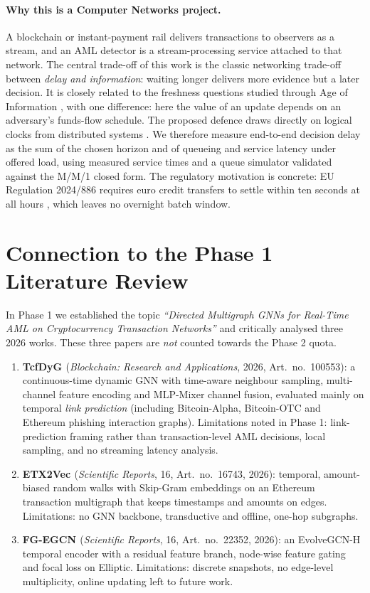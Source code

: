 \documentclass[11pt,a4paper]{article}
\begin{document}
\paragraph{Why this is a Computer Networks project.} A blockchain or instant-payment rail delivers transactions to observers as a stream, and an AML detector is a stream-processing service attached to that network. The central trade-off of this work is the classic networking trade-off between \emph{delay and information}: waiting longer delivers more evidence but a later decision. It is closely related to the freshness questions studied through Age of Information \cite{kaul2012aoi}, with one difference: here the value of an update depends on an adversary's funds-flow schedule. The proposed defence draws directly on logical clocks from distributed systems \cite{lamport1978clocks}. We therefore measure end-to-end decision delay as the sum of the chosen horizon and of queueing and service latency under offered load, using measured service times and a queue simulator validated against the M/M/1 closed form. The regulatory motivation is concrete: EU Regulation 2024/886 requires euro credit transfers to settle within ten seconds at all hours \cite{eu2024instant,abolfadl2026kontograph}, which leaves no overnight batch window.

\section{Connection to the Phase 1 Literature Review}
\label{sec:phase1_connection}

In Phase 1 we established the topic \textit{``Directed Multigraph GNNs for Real-Time AML on Cryptocurrency Transaction Networks''} and critically analysed three 2026 works. These three papers are \emph{not} counted towards the Phase 2 quota.
\begin{enumerate}[leftmargin=*]
    \item \textbf{TcfDyG \cite{li2026tcfdyg}} (\textit{Blockchain: Research and Applications}, 2026, Art.\ no.\ 100553): a continuous-time dynamic GNN with time-aware neighbour sampling, multi-channel feature encoding and MLP-Mixer channel fusion, evaluated mainly on temporal \emph{link prediction} (including Bitcoin-Alpha, Bitcoin-OTC and Ethereum phishing interaction graphs). Limitations noted in Phase 1: link-prediction framing rather than transaction-level AML decisions, local sampling, and no streaming latency analysis.
    \item \textbf{ETX2Vec \cite{lu2026etx2vec}} (\textit{Scientific Reports}, 16, Art.\ no.\ 16743, 2026): temporal, amount-biased random walks with Skip-Gram embeddings on an Ethereum transaction multigraph that keeps timestamps and amounts on edges. Limitations: no GNN backbone, transductive and offline, one-hop subgraphs.
    \item \textbf{FG-EGCN \cite{han2026fgegcn}} (\textit{Scientific Reports}, 16, Art.\ no.\ 22352, 2026): an EvolveGCN-H temporal encoder with a residual feature branch, node-wise feature gating and focal loss on Elliptic. Limitations: discrete snapshots, no edge-level multiplicity, online updating left to future work.
\end{enumerate}
\end{document}
